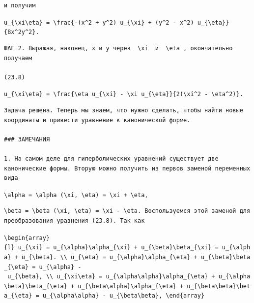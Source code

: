 \documentclass[
  ukrainian,
]{article}
\begin{document}
\begin{verbatim}
и получим
\end{verbatim}

\texttt{u\_\{\textbackslash{}xi\textbackslash{}eta\}\ =\ \textbackslash{}frac\{-(x\^{}2\ +\ y\^{}2)\ u\_\{\textbackslash{}xi\}\ +\ (y\^{}2\ -\ x\^{}2)\ u\_\{\textbackslash{}eta\}\}\{8x\^{}2y\^{}2\}.}

\begin{verbatim}
ШАГ 2. Выражая, наконец, x и y через  \xi  и  \eta , окончательно получаем

(23.8)
\end{verbatim}

\texttt{u\_\{\textbackslash{}xi\textbackslash{}eta\}\ =\ \textbackslash{}frac\{\textbackslash{}eta\ u\_\{\textbackslash{}xi\}\ -\ \textbackslash{}xi\ u\_\{\textbackslash{}eta\}\}\{2(\textbackslash{}xi\^{}2\ -\ \textbackslash{}eta\^{}2)\}.}

\begin{verbatim}
Задача решена. Теперь мы знаем, что нужно сделать, чтобы найти новые координаты и привести уравнение к канонической форме.

### ЗАМЕЧАНИЯ

1. На самом деле для гиперболических уравнений существует две канонические формы. Вторую можно получить из первов заменой переменных вида
\end{verbatim}

\texttt{\textbackslash{}alpha\ =\ \textbackslash{}alpha\ (\textbackslash{}xi,\ \textbackslash{}eta)\ =\ \textbackslash{}xi\ +\ \textbackslash{}eta,}

\begin{verbatim}
\beta = \beta (\xi, \eta) = \xi - \eta. Воспользуемся этой заменой для преобразования уравнения (23.8). Так как
\end{verbatim}

\texttt{\textbackslash{}begin\{array\}\{l\}\ u\_\{\textbackslash{}xi\}\ =\ u\_\{\textbackslash{}alpha\}\textbackslash{}alpha\_\{\textbackslash{}xi\}\ +\ u\_\{\textbackslash{}beta\}\textbackslash{}beta\_\{\textbackslash{}xi\}\ =\ u\_\{\textbackslash{}alpha\}\ +\ u\_\{\textbackslash{}beta\}.\ \textbackslash{}\textbackslash{}\ u\_\{\textbackslash{}eta\}\ =\ u\_\{\textbackslash{}alpha\}\textbackslash{}alpha\_\{\textbackslash{}eta\}\ +\ u\_\{\textbackslash{}beta\}\textbackslash{}beta\_\{\textbackslash{}eta\}\ =\ u\_\{\textbackslash{}alpha\}\ -\ u\_\{\textbackslash{}beta\},\ \textbackslash{}\textbackslash{}\ u\_\{\textbackslash{}xi\textbackslash{}eta\}\ =\ u\_\{\textbackslash{}alpha\textbackslash{}alpha\}\textbackslash{}alpha\_\{\textbackslash{}eta\}\ +\ u\_\{\textbackslash{}alpha\textbackslash{}beta\}\textbackslash{}beta\_\{\textbackslash{}eta\}\ +\ u\_\{\textbackslash{}beta\textbackslash{}alpha\}\textbackslash{}alpha\_\{\textbackslash{}eta\}\ +\ u\_\{\textbackslash{}beta\textbackslash{}beta\}\textbackslash{}beta\_\{\textbackslash{}eta\}\ =\ u\_\{\textbackslash{}alpha\textbackslash{}alpha\}\ -\ u\_\{\textbackslash{}beta\textbackslash{}beta\},\ \textbackslash{}end\{array\}}
\end{document}
